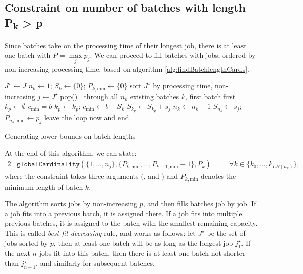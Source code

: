 \documentclass[13pt, letterpaper, oneside]{book}
\begin{document}
\subsection[Constraint on the number of batches with length $P_k >
p$]{Constraint on number of batches with length {\sansitalicfont
P\textsubscript{k}} > {\sansitalicfont p}}

Since batches take on the processing time of their longest job, there is at
least one batch with $P = \underset{j}{\max} p_j $. We can proceed to fill batches with jobs, ordered by non-increasing processing
time, based on algorithm \ref{alg:findBatchlengthCards}. 

\begin{algorithm}[h!]
\fontsize{9pt}{11.5pt}\selectfont \begin{algorithmic} \State $J^{\star} \gets J$
 \State $n_k \gets 1$; $S_k
\gets \{0\}$; $P_{k,\text{min}} \gets \{0\}$  \State sort $J^{\star}$ by processing time, non-increasing
\Repeat \State $j \gets J^{\star}$.pop()  \Loop $\;$ through all $n_k$ existing batches $k$, first
batch first \State $k_p \gets \emptyset$  \State
$c_\text{min} = b$   \State $k_p \gets k_p$; $c_\text{min} \gets
b-S_k$ \EndIf \EndLoop {} \State $S_{k_p} \gets S_{k_p} + s_j$
 \Else {} \State $n_k
\gets n_k + 1$ \State $S_{n_k} \gets s_j$;
$P_{n_k,\text{min}} \gets p_j$ 
\Else \State leave the loop now and end.  \EndIf \EndIf {} \end{algorithmic} \caption{Generating lower bounds on batch lengths}
\label{alg:findBatchlengthCards} \end{algorithm}
At the end of this algorithm, we can state: \begin{alignat}{2} &
\mathtt{globalCardinality}(\{1,\dots,n_j\},
\{P_{k,\text{min}}, \dots, P_{k-1,\text{min}} - 1\}, P_k) \quad && \forall k \in \{k_0,\dots,k_{LB(n_k)}\}, \end{alignat}
where the constraint takes three arguments (,  and ) and $P_{k,\text{min}}$ denotes the minimum length of batch $k$.

The algorithm sorts jobs by non-increasing $p$, and then fills batches job by
job. If a job fits into a previous batch, it is assigned there. If a job fits
into multiple previous batches, it is assigned to the batch with the smallest
remaining capacity. This is called \textit{best-fit decreasing} rule,
and works as follows: let $J^\star$ be the set of jobs sorted by $p$, then at
least one batch will be as long as the longest job $j^\star_1$. If the next $n$
jobs fit into this batch, then there is at least one batch not shorter than
$j^\star_{n+1}$, and similarly for subsequent batches. 
\end{document}
